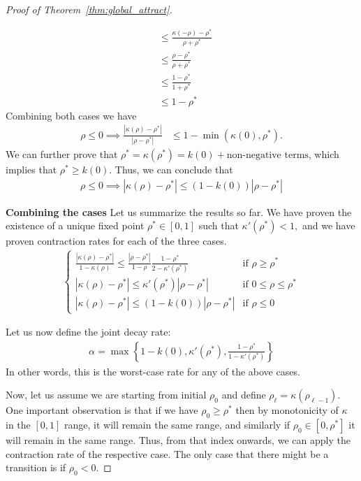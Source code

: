\documentclass[twoside]{article}
\theoremstyle{definition}
\begin{document}
\begin{proof}[Proof of Theorem~\ref{thm:global_attract}]
\begin{itemize}
\begin{align*}
&\le \frac{\kappa(-\rho)-\rho^*}{\rho+\rho^*} \\
&\le \frac{\rho-\rho^*}{\rho+\rho^*} \\
&\le \frac{1-\rho^*}{1+\rho^*} \\
&\le 1-\rho^*
\end{align*} 
Combining both cases we have 
\begin{align*}
\rho \le 0 \implies \frac{|\kappa(\rho)-\rho^*|}{|\rho-\rho^*|} &\le 1-\min(\kappa(0),\rho^*).
\end{align*}
We can further prove that $\rho^* = \kappa(\rho^*) = k(0) + \text{non-negative terms}$, which implies that $\rho^* \ge k(0)$. Thus, we can conclude that 
\begin{align*}
\rho \le 0 \implies |\kappa(\rho)-\rho^*| \le (1 - k(0))|\rho-\rho^*|
\end{align*}
\end{itemize}



\textbf{Combining the cases}
Let us summarize the results so far. We have proven the existence of a unique fixed point $\rho^*\in[0,1]$ such that $\kappa'(\rho^*)< 1,$ and we have proven contraction rates for each of the three cases.
\begin{align*}
\begin{cases}
\frac{|\kappa(\rho)-\rho^*|}{1-\kappa(\rho)} \le \frac{|\rho-\rho^*|}{1-\rho}\frac{1-\rho^*}{2-\kappa'(\rho^*)} & \text{if } \rho \ge \rho^* \\
|\kappa(\rho)-\rho^*| \le \kappa'(\rho^*)|\rho-\rho^*| & \text{if } 0 \le \rho \le \rho^*\\
|\kappa(\rho)-\rho^*| \le (1 - k(0))|\rho-\rho^*| & \text{if } \rho \le 0 
\end{cases}
\end{align*}


Let us now define the joint decay rate:
\begin{align*}
\alpha = \max\left\{1 - k(0), \kappa'(\rho^*), \frac{1-\rho^*}{1-\kappa'(\rho^*)}\right\}
\end{align*}
In other words, this is the worst-case rate for any of the above cases. 

Now, let us assume we are starting from initial $\rho_0$ and define $\rho_\ell = \kappa(\rho_{\ell-1})$. One important observation is that if we have $\rho_0 \ge \rho^*$ then by monotonicity of $\kappa$ in the $[0,1]$ range, it will remain the same range, and similarly if $\rho_0\in[0,\rho^*]$ it will remain in the same range. Thus, from that index onwards, we can apply the contraction rate of the respective case. The only case that there might be a transition is if $\rho_0 < 0$. 


\end{proof}
\end{document}
